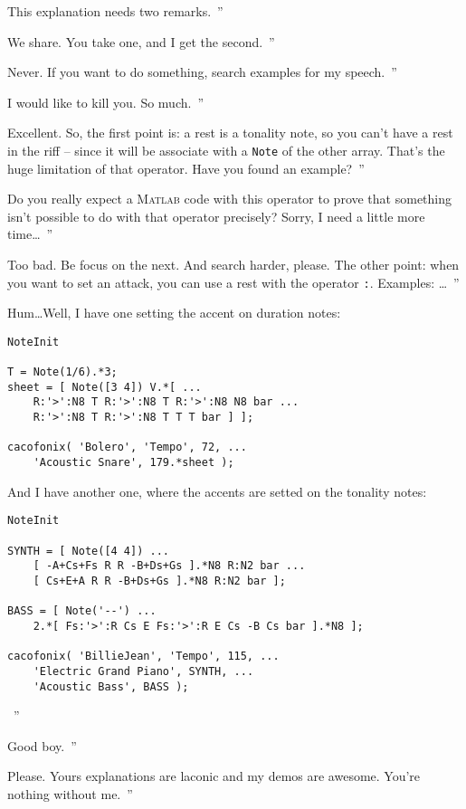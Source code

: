 \documentclass{article}
\newcommand{\matlab}{\textsc{Matlab}\xspace}
\newcommand{\note}{\lstinline!Note!\xspace}
\newenvironment{meenv}{ \par \noindent \makebox[6em][r]{ \textcolor{mecolor}{Me}: `` --~}}{~''}
\newenvironment{myselfenv}{ \par \noindent \makebox[6em][r]{ \textcolor{myselfcolor}{Myself}: `` --~}}{~''}
\newcommand{\me}[1]{\begin{meenv}#1\end{meenv}}
\newcommand{\myself}[1]{\begin{myselfenv}#1\end{myselfenv}}
\begin{document}
\me{This explanation needs two remarks.}
\myself{We share. You take one, and I get the second.}
\me{Never. If you want to do something, search examples for my speech.}
\myself{I would like to kill you. So much.}
\me{Excellent. So, the first point is: a rest is a tonality note, so you can't have a rest in the riff -- since it will be associate with a \note of the other array. That's the huge limitation of that operator. Have you found an example?}
\myself{Do you really expect a \matlab code with this operator to prove that something isn't possible to do with that operator precisely? Sorry, I need a little more time\dots}
\me{Too bad. Be focus on the next. And search harder, please. The other point: when you want to set an attack, you can use a rest with the operator \lstinline!:!. Examples: \dots}
\begin{myselfenv}
	Hum\dots Well, I have one setting the accent on duration notes:


\begin{lstlisting}
NoteInit

T = Note(1/6).*3;
sheet = [ Note([3 4]) V.*[ ...
	R:'>':N8 T R:'>':N8 T R:'>':N8 N8 bar ...
	R:'>':N8 T R:'>':N8 T T T bar ] ];

cacofonix( 'Bolero', 'Tempo', 72, ...
	'Acoustic Snare', 179.*sheet );
\end{lstlisting}

	And I have another one, where the accents are setted on the tonality notes:


\begin{lstlisting}
NoteInit

SYNTH = [ Note([4 4]) ...
	[ -A+Cs+Fs R R -B+Ds+Gs ].*N8 R:N2 bar ...
	[ Cs+E+A R R -B+Ds+Gs ].*N8 R:N2 bar ];

BASS = [ Note('--') ...
	2.*[ Fs:'>':R Cs E Fs:'>':R E Cs -B Cs bar ].*N8 ];

cacofonix( 'BillieJean', 'Tempo', 115, ...
	'Electric Grand Piano', SYNTH, ...
	'Acoustic Bass', BASS );
\end{lstlisting}
\end{myselfenv}
\me{Good boy.}
\myself{Please. Yours explanations are laconic and my demos are awesome. You're nothing without me.}
\end{document}
